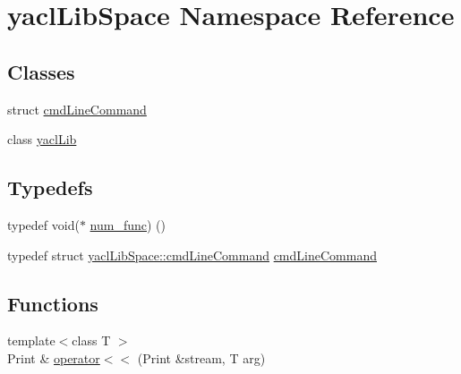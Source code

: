\hypertarget{namespaceyacl_lib_space}{}\section{yacl\+Lib\+Space Namespace Reference}
\label{namespaceyacl_lib_space}
\subsection*{Classes}
\begin{DoxyCompactItemize}
\item 
struct \mbox{\hyperlink{structyacl_lib_space_1_1cmd_line_command}{cmd\+Line\+Command}}
\item 
class \mbox{\hyperlink{classyacl_lib_space_1_1yacl_lib}{yacl\+Lib}}
\end{DoxyCompactItemize}
\subsection*{Typedefs}
\begin{DoxyCompactItemize}
\item 
typedef void($\ast$ \mbox{\hyperlink{namespaceyacl_lib_space_abe18da2116a229caa63a12870966ac35}{num\+\_\+func}}) ()
\item 
typedef struct \mbox{\hyperlink{structyacl_lib_space_1_1cmd_line_command}{yacl\+Lib\+Space\+::cmd\+Line\+Command}} \mbox{\hyperlink{namespaceyacl_lib_space_a07daa105cee1dad270e270163e5278f9}{cmd\+Line\+Command}}
\end{DoxyCompactItemize}
\subsection*{Functions}
\begin{DoxyCompactItemize}
\item 
{\footnotesize template$<$class T $>$ }\\Print \& \mbox{\hyperlink{namespaceyacl_lib_space_af69553ba98439734b940aa27111a72c3}{operator$<$$<$}} (Print \&stream, T arg)
\end{DoxyCompactItemize}

